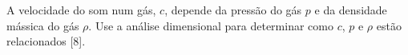 A velocidade do som num gás, $c$, depende da pressão do gás $p$ e da densidade mássica do gás $\rho$. Use a análise dimensional para determinar como $c$, $p$ e $\rho$ estão relacionados [8].
